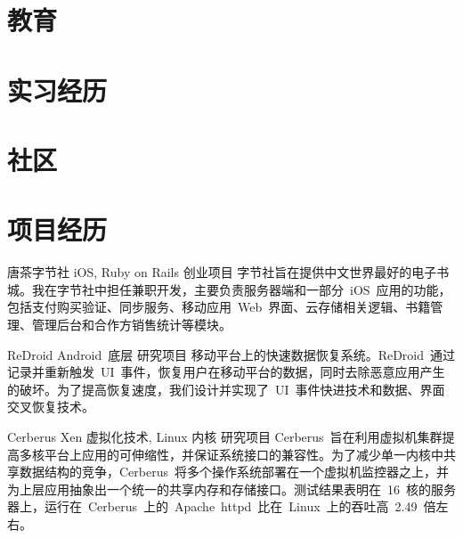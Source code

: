 \documentclass[11pt,a4paper]{moderncv}
\title{}               %
\begin{document}
\maketitle

\section{教育}

\section{实习经历}

\section{社区}

\section{项目经历}
\renewcommand{\baselinestretch}{1.2}

{唐茶字节社}
{iOS, Ruby on Rails}
{创业项目}{}
{字节社旨在提供中文世界最好的电子书城。我在字节社中担任兼职开发，主要负责服务器端和一部分~iOS~应用的功能，包括支付购买验证、同步服务、移动应用~Web~界面、云存储相关逻辑、书籍管理、管理后台和合作方销售统计等模块。}

\vspace*{0.2\baselineskip}
{ReDroid}
{Android~底层}
{研究项目}{}
{移动平台上的快速数据恢复系统。ReDroid~通过记录并重新触发~UI~事件，恢复用户在移动平台的数据，同时去除恶意应用产生的破坏。为了提高恢复速度，我们设计并实现了~UI~事件快进技术和数据、界面交叉恢复技术。}

\vspace*{0.2\baselineskip}
{Cerberus}
{Xen 虚拟化技术, Linux 内核}
{研究项目}{}
{Cerberus~旨在利用虚拟机集群提高多核平台上应用的可伸缩性，并保证系统接口的兼容性。为了减少单一内核中共享数据结构的竞争，Cerberus~将多个操作系统部署在一个虚拟机监控器之上，并为上层应用抽象出一个统一的共享内存和存储接口。测试结果表明在~16~核的服务器上，运行在~Cerberus~上的~Apache~httpd~比在~Linux~上的吞吐高~2.49~倍左右。}
\end{document}
